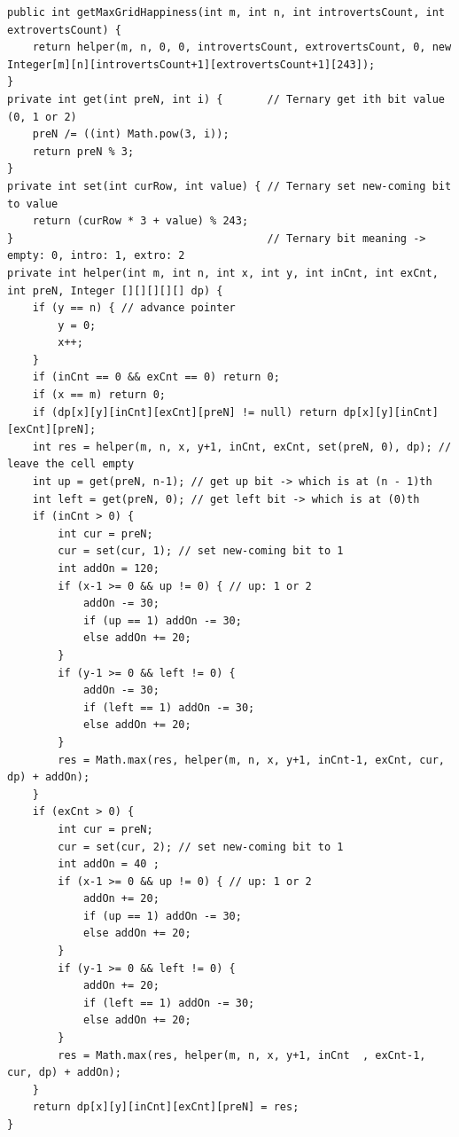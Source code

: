 \documentclass[9pt, b5paaper]{book}
\begin{document}
\begin{verbatim}
public int getMaxGridHappiness(int m, int n, int introvertsCount, int extrovertsCount) {
    return helper(m, n, 0, 0, introvertsCount, extrovertsCount, 0, new Integer[m][n][introvertsCount+1][extrovertsCount+1][243]);
}        
private int get(int preN, int i) {       // Ternary get ith bit value (0, 1 or 2)
    preN /= ((int) Math.pow(3, i));
    return preN % 3;
}
private int set(int curRow, int value) { // Ternary set new-coming bit to value
    return (curRow * 3 + value) % 243;
}                                        // Ternary bit meaning -> empty: 0, intro: 1, extro: 2
private int helper(int m, int n, int x, int y, int inCnt, int exCnt, int preN, Integer [][][][][] dp) {
    if (y == n) { // advance pointer
        y = 0;
        x++;
    }
    if (inCnt == 0 && exCnt == 0) return 0;
    if (x == m) return 0;
    if (dp[x][y][inCnt][exCnt][preN] != null) return dp[x][y][inCnt][exCnt][preN];
    int res = helper(m, n, x, y+1, inCnt, exCnt, set(preN, 0), dp); // leave the cell empty
    int up = get(preN, n-1); // get up bit -> which is at (n - 1)th
    int left = get(preN, 0); // get left bit -> which is at (0)th
    if (inCnt > 0) {
        int cur = preN;
        cur = set(cur, 1); // set new-coming bit to 1
        int addOn = 120;
        if (x-1 >= 0 && up != 0) { // up: 1 or 2
            addOn -= 30;
            if (up == 1) addOn -= 30;
            else addOn += 20;
        }
        if (y-1 >= 0 && left != 0) {
            addOn -= 30;
            if (left == 1) addOn -= 30;
            else addOn += 20;
        }
        res = Math.max(res, helper(m, n, x, y+1, inCnt-1, exCnt, cur, dp) + addOn);
    }
    if (exCnt > 0) {
        int cur = preN;
        cur = set(cur, 2); // set new-coming bit to 1
        int addOn = 40 ;
        if (x-1 >= 0 && up != 0) { // up: 1 or 2
            addOn += 20;
            if (up == 1) addOn -= 30;
            else addOn += 20;
        }
        if (y-1 >= 0 && left != 0) {
            addOn += 20;
            if (left == 1) addOn -= 30;
            else addOn += 20;
        }
        res = Math.max(res, helper(m, n, x, y+1, inCnt  , exCnt-1, cur, dp) + addOn);
    }
    return dp[x][y][inCnt][exCnt][preN] = res;
}
\end{verbatim}
\end{document}
